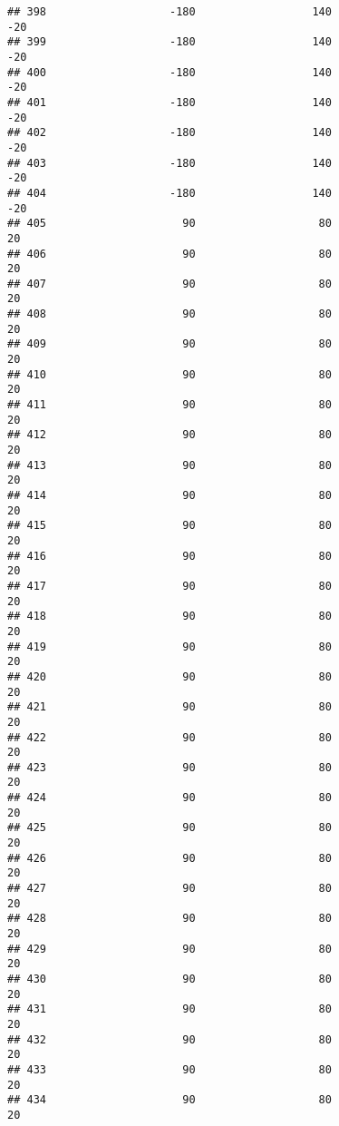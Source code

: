 \documentclass[]{article}
\begin{document}
\begin{verbatim}
## 398                   -180                  140                  -20
## 399                   -180                  140                  -20
## 400                   -180                  140                  -20
## 401                   -180                  140                  -20
## 402                   -180                  140                  -20
## 403                   -180                  140                  -20
## 404                   -180                  140                  -20
## 405                     90                   80                   20
## 406                     90                   80                   20
## 407                     90                   80                   20
## 408                     90                   80                   20
## 409                     90                   80                   20
## 410                     90                   80                   20
## 411                     90                   80                   20
## 412                     90                   80                   20
## 413                     90                   80                   20
## 414                     90                   80                   20
## 415                     90                   80                   20
## 416                     90                   80                   20
## 417                     90                   80                   20
## 418                     90                   80                   20
## 419                     90                   80                   20
## 420                     90                   80                   20
## 421                     90                   80                   20
## 422                     90                   80                   20
## 423                     90                   80                   20
## 424                     90                   80                   20
## 425                     90                   80                   20
## 426                     90                   80                   20
## 427                     90                   80                   20
## 428                     90                   80                   20
## 429                     90                   80                   20
## 430                     90                   80                   20
## 431                     90                   80                   20
## 432                     90                   80                   20
## 433                     90                   80                   20
## 434                     90                   80                   20

\end{verbatim}
\end{document}

